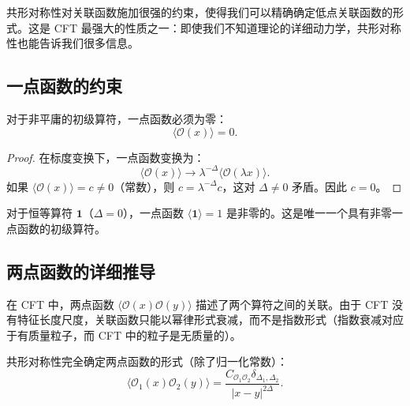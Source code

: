 共形对称性对关联函数施加很强的约束，使得我们可以精确确定低点关联函数的形式。这是 CFT 最强大的性质之一：即使我们不知道理论的详细动力学，共形对称性也能告诉我们很多信息。

\subsection{一点函数的约束}

\begin{theorem}[一点函数为零]
对于非平庸的初级算符，一点函数必须为零：
\begin{equation}
    \langle \mathcal{O}(x) \rangle = 0.
\end{equation}
\end{theorem}

\begin{proof}
在标度变换下，一点函数变换为：
\begin{equation}
    \langle \mathcal{O}(x) \rangle \to \lambda^{-\Delta} \langle \mathcal{O}(\lambda x) \rangle.
\end{equation}
如果 $\langle \mathcal{O}(x) \rangle = c \neq 0$（常数），则 $c = \lambda^{-\Delta} c$，这对 $\Delta \neq 0$ 矛盾。因此 $c = 0$。
\end{proof}

\begin{remark}
对于恒等算符 $\mathbf{1}$（$\Delta = 0$），一点函数 $\langle \mathbf{1} \rangle = 1$ 是非零的。这是唯一一个具有非零一点函数的初级算符。
\end{remark}

\subsection{两点函数的详细推导}

\begin{note}[物理动机]
在 CFT 中，两点函数 $\langle \mathcal{O}(x) \mathcal{O}(y) \rangle$ 描述了两个算符之间的关联。由于 CFT 没有特征长度尺度，关联函数只能以幂律形式衰减，而不是指数形式（指数衰减对应于有质量粒子，而 CFT 中的粒子是无质量的）。
\end{note}

\begin{theorem}[两点函数的形式]
共形对称性完全确定两点函数的形式（除了归一化常数）：
\begin{equation}
    \langle \mathcal{O}_1(x) \mathcal{O}_2(y) \rangle = \frac{C_{\mathcal{O}_1\mathcal{O}_2} \delta_{\Delta_1, \Delta_2}}{|x - y|^{2\Delta}}.
\end{equation}
\end{theorem}

